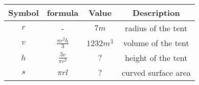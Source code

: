   \begin{tabular}{|c|c|c|c|}
    \hline
     Symbol & formula & Value & Description \\
    \hline \hline
     $r$ & - & $7m$ & radius of the tent\\
    \hline
     $v$ & $\frac{\pi r^2 h}{3}$ & $1232 m^3$ & volume of the tent \\
    \hline
     $h$ & $\frac{3 v}{\pi r^2}$ & $?$ & height of the tent  \\
    \hline
     $s$ & $ \pi r l $ & $?$ & curved surface area \\
    \hline
 \end{tabular}